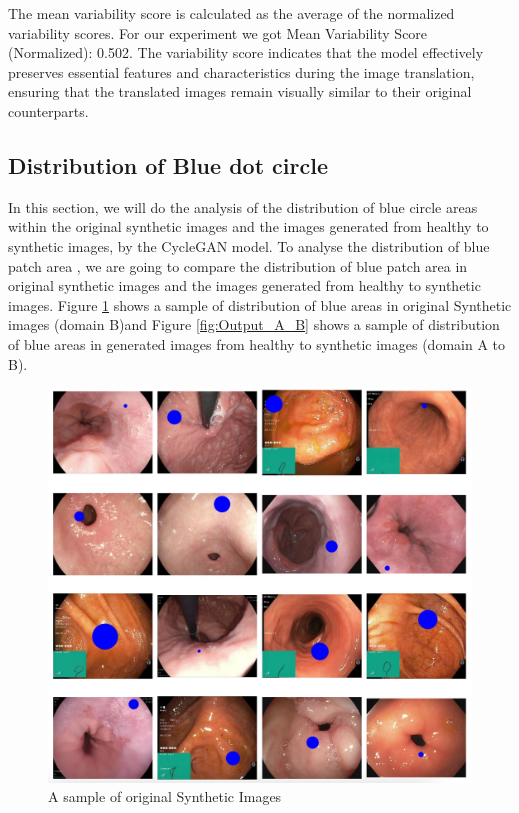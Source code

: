 \documentclass[UKenglish,12pt]{master-style}
\begin{document}
The mean variability score is calculated as the average of the normalized variability scores. For our experiment we got Mean Variability Score (Normalized): 0.502. The variability score indicates that the model effectively preserves essential features and characteristics during the image translation, ensuring that the translated images remain visually similar to their original counterparts.

\subsection{Distribution of Blue dot circle}

In this section, we will do the analysis of the distribution of blue circle areas within the original synthetic images and the images generated from healthy to synthetic images, by the CycleGAN model. 
To analyse the distribution of blue patch area , we are going to compare the distribution of blue patch area in original synthetic images and the images generated from healthy to synthetic images.
Figure \ref{fig:Synthetic_images} shows a sample of distribution of blue areas in original Synthetic images (domain B)and Figure \ref{fig:Output_A_B} shows a sample of distribution of blue areas in generated images from healthy to synthetic images (domain A to B).

\begin{figure}[htbp]
    \centering
    \includegraphics[width=1\textwidth]{Images/Synthetic_images.jpeg}
    \caption{A sample of original Synthetic Images}
    \label{fig:Synthetic_images}
\end{figure}
\end{document}
